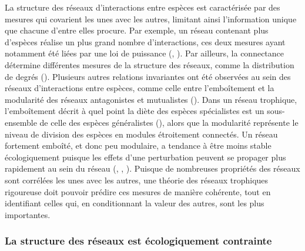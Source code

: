 La structure des réseaux d'interactions entre espèces est caractérisée par des
mesures qui covarient les unes avec les autres, limitant ainsi l'information
unique que chacune d'entre elles procure. Par exemple, un réseau contenant plus
d'espèces réalise un plus grand nombre d'interactions, ces deux mesures ayant
notamment été liées par une loi de puissance (\cite{Brose2004Unified},
\cite{Riede2010Chapter}). Par ailleurs, la connectance détermine différentes
mesures de la structure des réseaux, comme la distribution de degrés
(\cite{Poisot2014When}). Plusieurs autres relations invariantes ont été
observées au sein des réseaux d'interactions entre espèces, comme celle entre
l'emboîtement et la modularité des réseaux antagonistes et mutualistes
(\cite{Fortuna2010Nestedness}). Dans un réseau trophique, l'emboîtement décrit à
quel point la diète des espèces spécialistes est un sous-ensemble de celle des
espèces généralistes (\cite{Staniczenko2013Ghost}), alors que la modularité
représente le niveau de division des espèces en modules étroitement connectés.
Un réseau fortement emboîté, et donc peu modulaire, a tendance à être moins
stable écologiquement puisque les effets d'une perturbation peuvent se propager
plus rapidement au sein du réseau (\cite{Okuyama2008Network},
\cite{Bastolla2009Architecture}, \cite{Thebault2010Stability}). Puisque de
nombreuses propriétés des réseaux sont corrélées les unes avec les autres, une
théorie des réseaux trophiques rigoureuse doit pouvoir prédire ces mesures de
manière cohérente, tout en identifiant celles qui, en conditionnant la valeur
des autres, sont les plus importantes.

\subsubsection{La structure des réseaux est écologiquement contrainte} 

